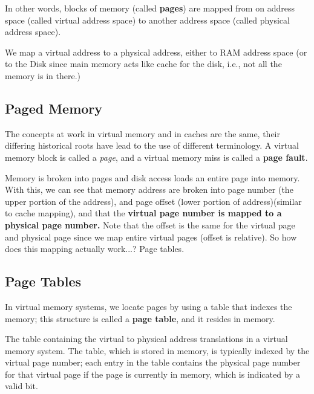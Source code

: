 \documentclass[12pt]{article}
\begin{document}
In other words, blocks of memory (called \textbf{pages}) are mapped from on address space (called virtual address space) to another address space (called physical address space).

We map a virtual address to a physical address, either to RAM address space (or to the Disk since main memory acts like cache for the disk, i.e., not all the memory is in there.)

\subsection*{Paged Memory}
The concepts at work in virtual memory and in caches are the same, their differing historical roots have lead to the use of different terminology. A virtual memory block is called a \emph{page}, and a virtual memory miss is called a \textbf{page fault}.

Memory is broken into pages and disk access loads an entire page into memory. With this, we can see that memory address are broken into page number (the upper portion of the address), and page offset (lower portion of address)(similar to cache mapping), and that the \textbf{virtual page number is mapped to a physical page number.} Note that the offset is the same for the virtual page and physical page since we map entire virtual pages (offset is relative). So how does this mapping actually work...? Page tables.

\subsection*{Page Tables}
In virtual memory systems, we locate pages by using a table that indexes the memory; this structure is called a \textbf{page table}, and it resides in memory.
\begin{definition}
    The table containing the virtual to physical address translations in a virtual memory system. The table, which is stored in memory, is typically indexed by the virtual page number; each entry in the table contains the physical page number for that virtual page if the page is currently in memory, which is indicated by a valid bit.
\end{definition}
\end{document}

